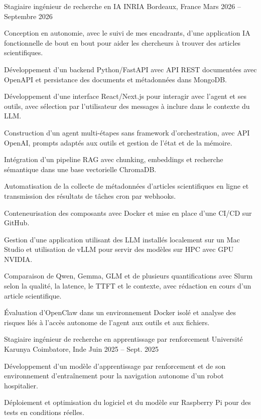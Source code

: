 
\begin{cventries}
  \cventry
    {Stagiaire ingénieur de recherche en IA}
    {INRIA}
    {Bordeaux, France}
    {Mars 2026 -- Septembre 2026}
    {
      \begin{cvitems}
        \item {Conception en autonomie, avec le suivi de mes encadrants, d’une application IA fonctionnelle de bout en bout pour aider les chercheurs à trouver des articles scientifiques.}
        \item {Développement d’un backend Python/FastAPI avec API REST documentées avec OpenAPI et persistance des documents et métadonnées dans MongoDB.}
        \item {Développement d’une interface React/Next.js pour interagir avec l’agent et ses outils, avec sélection par l’utilisateur des messages à inclure dans le contexte du LLM.}
        \item {Construction d’un agent multi-étapes sans framework d’orchestration, avec API OpenAI, prompts adaptés aux outils et gestion de l’état et de la mémoire.}
        \item {Intégration d’un pipeline RAG avec chunking, embeddings et recherche sémantique dans une base vectorielle ChromaDB.}
        \item {Automatisation de la collecte de métadonnées d’articles scientifiques en ligne et transmission des résultats de tâches cron par webhooks.}
        \item {Conteneurisation des composants avec Docker et mise en place d’une CI/CD sur GitHub.}
        \item {Gestion d’une application utilisant des LLM installés localement sur un Mac Studio et utilisation de vLLM pour servir des modèles sur HPC avec GPU NVIDIA.}
        \item {Comparaison de Qwen, Gemma, GLM et de plusieurs quantifications avec Slurm selon la qualité, la latence, le TTFT et le contexte, avec rédaction en cours d’un article scientifique.}
        \item {Évaluation d’OpenClaw dans un environnement Docker isolé et analyse des risques liés à l’accès autonome de l’agent aux outils et aux fichiers.}
      \end{cvitems}
    }

  \cventry
    {Stagiaire ingénieur de recherche en apprentissage par renforcement}
    {Université Karunya}
    {Coimbatore, Inde}
    {Juin 2025 -- Sept. 2025}
    {
      \begin{cvitems}
        \item {Développement d’un modèle d’apprentissage par renforcement et de son environnement d’entraînement pour la navigation autonome d’un robot hospitalier.}
        \item {Déploiement et optimisation du logiciel et du modèle sur Raspberry Pi pour des tests en conditions réelles.}
      \end{cvitems}
    }
\end{cventries}
